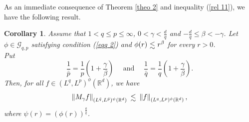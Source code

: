 \documentclass[10pt,a4paper]{amsart}
\numberwithin{equation}{section}
\newtheorem{corollary}[theorem]{Corollary}
\numberwithin{equation}{section}
\def\lsim{\raisebox{-1ex}{$~\stackrel{\textstyle <}{\sim}~$}}
\begin{document}
As an immediate consequence of Theorem \ref{theo 2} and inequality (\ref{rel 11}), we have the
following result.
\begin{corollary}
Assume that $1 < q\leq p \leq \infty$, $ 0 < \gamma < \frac{d}{q}$ and $-\frac{d}{q} \leq \beta  < -\gamma $. Let $\phi\in \mathcal{G}_{q,p}$ satisfying condition (\ref{eqq 2}) and $\phi(r) \lsim  r^{\beta}$ for every $r > 0$. \\ Put $$\frac{1}{\bar{p}} = \frac{1}{p}\left(1 +\frac{\gamma}{\beta}\right) \quad \text{ and } \quad \frac{1}{\bar{q}} = \frac{1}{q}\left(1 +\frac{\gamma}{\beta}\right). $$
 Then, for all  $f \in (L^{q},L^{p})^{\phi}(\mathbb{R}^{d})$, we have
 $$\left\Vert M_{\gamma}f \right\Vert_{(L^{\bar{q}},L^{\bar{p}})^{\psi}(\mathbb{R}^{d})} \lsim  \left\Vert f  \right\Vert_{(L^{q},L^{p})^{\phi}(\mathbb{R}^{d})},$$ where  $\psi(r)= (\phi(r))^{\frac{q}{\bar{q}}}$.
\end{corollary}
\end{document}
